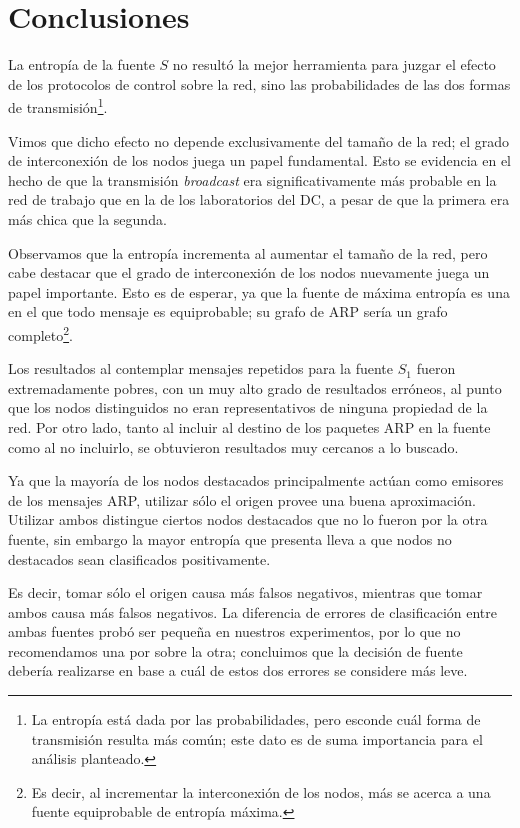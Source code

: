 \section{Conclusiones}

\par La entropía de la fuente $S$ no resultó la mejor herramienta para juzgar el efecto de los protocolos de control sobre la red, sino las probabilidades de las dos formas de transmisión\footnote{La entropía está dada por las probabilidades, pero esconde cuál forma de transmisión resulta más común; este dato es de suma importancia para el análisis planteado.}.

\par Vimos que dicho efecto no depende exclusivamente del tamaño de la red; el grado de interconexión de los nodos juega un papel fundamental.
Esto se evidencia en el hecho de que la transmisión \textit{broadcast} era significativamente más probable en la red de trabajo que en la de los laboratorios del DC, a pesar de que la primera era más chica que la segunda.

\par Observamos que la entropía incrementa al aumentar el tamaño de la red, pero cabe destacar que el grado de interconexión de los nodos nuevamente juega un papel importante.
Esto es de esperar, ya que la fuente de máxima entropía es una en el que todo mensaje es equiprobable; su grafo de ARP sería un grafo completo\footnote{Es decir, al incrementar la interconexión de los nodos, más se acerca a una fuente equiprobable de entropía máxima.}.

\par Los resultados al contemplar mensajes repetidos para la fuente $S_1$ fueron extremadamente pobres, con un muy alto grado de resultados erróneos, al punto que los nodos distinguidos no eran representativos de ninguna propiedad de la red.
Por otro lado, tanto al incluir al destino de los paquetes ARP en la fuente como al no incluirlo, se obtuvieron resultados muy cercanos a lo buscado.

\par Ya que la mayoría de los nodos destacados principalmente actúan como emisores de los mensajes ARP, utilizar sólo el origen provee una buena aproximación.
Utilizar ambos distingue ciertos nodos destacados que no lo fueron por la otra fuente, sin embargo la mayor entropía que presenta lleva a que nodos no destacados sean clasificados positivamente.

\par Es decir, tomar sólo el origen causa más falsos negativos, mientras que tomar ambos causa más falsos negativos. 
La diferencia de errores de clasificación entre ambas fuentes probó ser pequeña en nuestros experimentos, por lo que no recomendamos una por sobre la otra; concluimos que la decisión de fuente debería realizarse en base a cuál de estos dos errores se considere más leve. 

